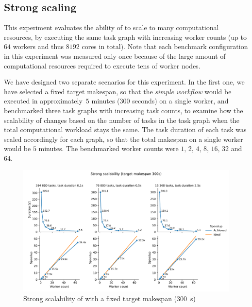 \subsection{Strong scaling}
\label{sec:hq-exp-scalability}
This experiment evaluates the ability of \hyperqueue{} to scale to many computational
resources, by executing the same task graph with increasing worker counts (up to
$64$ workers and thus $8192$ cores in total). Note that each
benchmark configuration in this experiment was measured only once because of the large amount of
computational resources required to execute tens of worker nodes.

We have designed two separate scenarios for this experiment. In the first one, we have selected a
fixed target makespan, so that the \emph{simple workflow} would be executed in approximately\
$5$ minutes ($300$ seconds) on a single worker, and benchmarked
three task graphs with increasing task counts, to examine how the scalability of
\hyperqueue{} changes based on the number of tasks in the task graph when the total
computational workload stays the same. The task duration of each task was scaled accordingly for
each graph, so that the total makespan on a single worker would be $5$ minutes.
The benchmarked worker counts were $1$, $2$,
$4$, $8$, $16$, $32$ and
$64$.

\begin{figure}[h]
	\centering
	\includegraphics[width=\textwidth]{imgs/hq/charts/scalability-fixed-makespan}
	\caption{Strong scalability of \hyperqueue{} with a fixed target makespan
	(\SI{300}{\second})}
	\label{fig:hq-scalability-fixed-makespan}
\end{figure}

